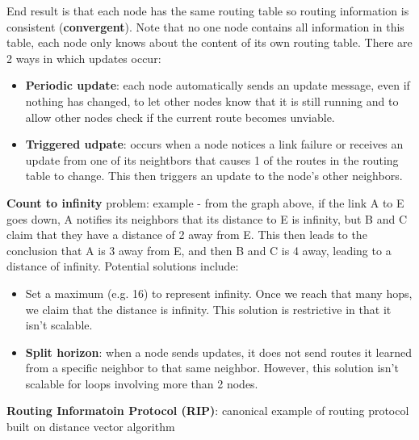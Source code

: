 \documentclass{article}
\begin{document}
  End result is that each node has the same routing table so routing information is consistent (\textbf{convergent}). Note that no one node contains all information in this table, each node only knows about the content of its own routing table. There are 2 ways in which updates occur:
  \begin{itemize}
    \item \textbf{Periodic update}: each node automatically sends an update message, even if nothing has changed, to let other nodes know that it is still running and to allow other nodes check if the current route becomes unviable.
    \item \textbf{Triggered udpate}: occurs when a node notices a link failure or receives an update from one of its neightbors that causes 1 of the routes in the routing table to change. This then triggers an update to the node's other neighbors.
  \end{itemize}
  \textbf{Count to infinity} problem: example - from the graph above, if the link A to E goes down, A notifies its neighbors that its distance to E is infinity, but B and C claim that they have a distance of 2 away from E. This then leads to the conclusion that A is 3 away from E, and then B and C is 4 away, leading to a distance of infinity. Potential solutions include:
  \begin{itemize}
    \item Set a maximum (e.g. 16) to represent infinity. Once we reach that many hops, we claim that the distance is infinity. This solution is restrictive in that it isn't scalable.
    \item \textbf{Split horizon}: when a node sends updates, it does not send routes it learned from a specific neighbor to that same neighbor. However, this solution isn't scalable for loops involving more than 2 nodes.
  \end{itemize}
  \textbf{Routing Informatoin Protocol (RIP)}: canonical example of routing protocol built on distance vector algorithm
\end{document}
